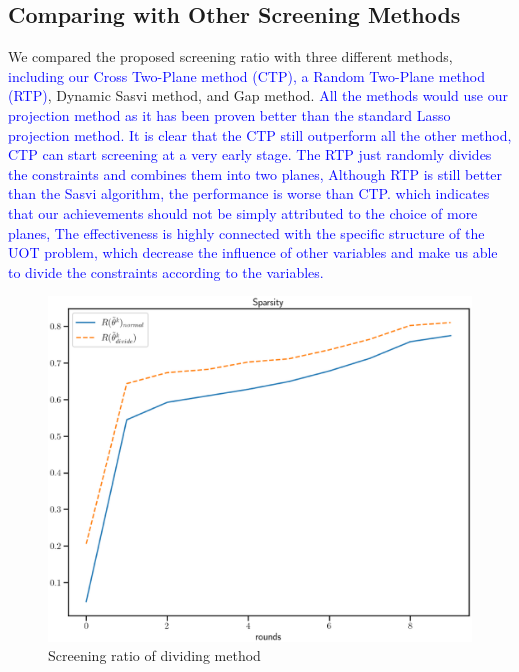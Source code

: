 \documentclass[twoside]{article}
\theoremstyle{plain}
\newcommand{\changeXS}[1]{\textcolor{blue}{#1}}
\begin{document}
%
%


\subsection{Comparing with Other Screening Methods}
We compared the proposed screening ratio with three different methods, \changeXS{including our Cross Two-Plane method (CTP), a Random Two-Plane method (RTP)}, Dynamic Sasvi method, and Gap method. \changeXS{All the methods would use our projection method as it has been proven better than the standard Lasso projection method. It is clear that the CTP still outperform all the other method, CTP can start screening at a very early stage. The RTP just randomly divides the constraints and combines them into two planes, Although RTP is still better than the Sasvi algorithm, the performance is worse than CTP. which indicates that our achievements should not be simply attributed to the choice of more planes, The effectiveness is highly connected with the specific structure of the UOT problem, which decrease the influence of other variables and make us able to divide the constraints according to the variables.}
\begin{figure}[h]
\begin{center}
\includegraphics[width = \linewidth]{pic/screening_divide_ratio_long}
\caption{Screening ratio of dividing method}
\end{center}
\end{figure}
\end{document}
